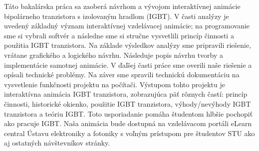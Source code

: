 Táto bakalárska práca sa zaoberá návrhom a vývojom interaktívnej animácie bipolárneho tranzistora s izolovaným hradlom (\acrshort{IGBT}). V časti analýzy je uvedený základný význam interaktívnej vzdelávacej animácie; na programovanie sme si vybrali softvér a následne sme si stručne vysvetlili princíp činnosti a použitia \acrshort{IGBT} tranzistora. Na základe výsledkov analýzy sme pripravili riešenie, vrátane grafického a logického návrhu. Následuje popis návrhu tvorby a implementácie samotnej animácie. V ďaľšej časti práce sme overili naše riešenie a opísali technické problémy. Na záver sme spravili technickú dokumentáciu na vysvetlenie funkčnosti projektu na počítači. Výstupom tohto projektu je interaktívna animácia \acrshort{IGBT} tranzistora, zobrazujúca päť rôznych častí: princíp činnosti, historické okienko, použitie \acrshort{IGBT} tranzistora, výhody/nevýhody \acrshort{IGBT} tranzistora a teóriu IGBT. Toto usporiadanie pomáha študentom hlbšie pochopiť ako pracuje \acrshort{IGBT}. Naša animácia bude dostupná na vzdelávacom portáli eLearn central Ústavu elektroniky a fotoniky s voľným prístupom pre študentov STU ako aj ostatných návštevníkov stránky.